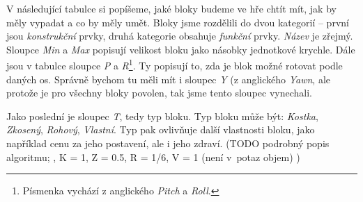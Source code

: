 V následující tabulce si popíšeme, jaké bloky budeme ve hře chtít mít, jak by měly vypadat a co by měly umět. Bloky jsme rozdělili do dvou kategorií -- první jsou \textit{konstrukční} prvky, druhá kategorie obsahuje \textit{funkční} prvky. \textit{Název} je zřejmý. Sloupce \textit{Min} a \textit{Max} popisují velikost bloku jako násobky jednotkové krychle. Dále jsou v tabulce sloupce \textit{P} a \textit{R}\footnote{Písmenka vychází z anglického \textit{Pitch} a \textit{Roll}. }. Ty popisují to, zda je blok možné rotovat podle daných os. Správně bychom tu měli mít i sloupec \textit{Y} (z anglického \textit{Yawn}, ale protože je pro všechny bloky povolen, tak jsme tento sloupec vynechali. 


Jako poslední je sloupec \textit{T}, tedy typ bloku. Typ bloku může být: \textit{Kostka}, \textit{Zkosený}, \textit{Rohový}, \textit{Vlastní}. Typ pak ovlivňuje další vlastnosti bloku, jako například cenu za jeho postavení, ale i jeho zdraví. (TODO podrobný popis algoritmu; , K = 1, Z = 0.5, R = 1/6, V = 1 (není v~potaz objem) )


